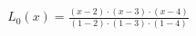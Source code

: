 \documentclass[preview]{standalone}
\begin{document}
\begin{align*}
L_0(x) = \frac{(x - 2) \cdot (x - 3) \cdot (x - 4)}{(1 - 2) \cdot (1 - 3) \cdot (1 - 4)}
\end{align*}
\end{document}
